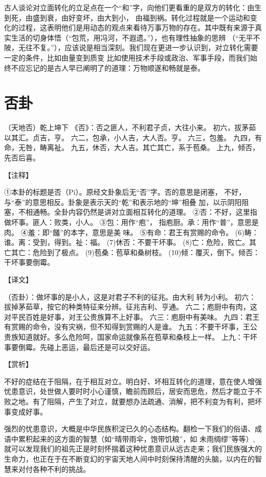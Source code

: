 \documentclass[12pt,UTF8]{ctexbook}
\begin{document}
古人谈论对立面转化的立足点在一个“和”字，向他们更看重的是双方的转化：由生到死，由盛到衰，由好变坏，由大到小， 由福到祸。转化过程就是一个运动和变化的过程，这表明他们是用动态的观点来看待万事万物的存在。其中既有来源于真实生活的切身体悟（“包荒，用冯河，不遐遗。”），也有理性抽象的思辨 （“无平不陂，无往不复。”），应该说是相当深刻。我们现在更进一步认识到，对立转化需要一定的条件，比如由量变到质变 比如使用技术手段或政治、军事手段，而我们始终不应忘记的是古人早已阐明了的道理：万物顺遂和畅就是泰。

\chapter{否卦}

（天地否）乾上坤下
《否》：否之匪人，不利君子贞，大往小来。
初六，拔茅茹以其汇。贞吉，亨。
六二，包承，小人吉，大人否。亨。
六三，包羞。
九四，有命，无咎，畴离祉。
九五，休否，大人吉。其亡其亡，系于苞桑。
上九，倾否，先否后喜。

【注释】

①本卦的标题是否（Pi）。原经文卦象后无“否”字。否的意思是闭塞， 不好，与“泰”的意思相反。卦象是表示天的“乾”和表示地的“坤”相叠 加，以示阴阳阻塞，不相通畅。全卦内容仍然是讲对立面相互转化的道理。
②否：不好，这里指做坏事。匪人：败类，小人。
③包：用作“庖”， 指庖厨。承：用作“普”，意思是肉。
④羞：即“饈”的本字，意思是美 味。
⑤有命：君王有赏赐的命令。
(6)畴：谁。离：受到，得到。祉：福。
(7)休否：不要干坏事。
(8)亡：危险，败亡。其亡其亡：危险到了极点。
(9)苞桑：苞草和桑树枝。
(10)倾：覆灭，倒下。倾否：干坏事要倒霉。

【译文】

（否卦）：做坏事的是小人，这是对君子不利的征兆。由大利 转为小利。
初六：拔掉茅茹草，按它的种类特征来分辨。征兆吉利、亨通。
六二；庖厨中有肉，这对平民百姓是好事，对王公贵族算不上好事。
六三：庖厨中有美味。
九四：君王有赏赐的命令，没有灾祸，但不知得到赏赐的人是谁。
九五：不要干坏事，王公贵族知道就好。多么危险呵，国家命运就像系在苞草和桑枝上一样。
上九：干坏事要倒霉。先碰上恶运，最后还是可以交好运。

【赏析】

不好的症结在于阻隔，在于相互对立。明白好、坏相互转化的道理，意在使人增强忧患意识，处世做人要时时小心谨慎，瞻前而顾后，居安而思危，然后才能立于不败之地。有了阻隔，产生了对立，就要想办法疏通、消解，把不利变为有利，把坏事变成好事。

强烈的忧患意识，大概是中华民族积淀已久的心态结构。翻检一下我们的俗语、成语中累积起来的这方面的智慧（如“晴带雨伞，饱带饥粮”，如 未雨绸缪”等等）, 就可以发现我们的祖先正是时刻怀揣着这种忧患意识从远古走来；我们民族强大的生命力，也正在于在不断变幻的宇宙天地人间中时刻保持清醒的头脑，以内在的智慧来对付各种不利的挑战。
\end{document}
